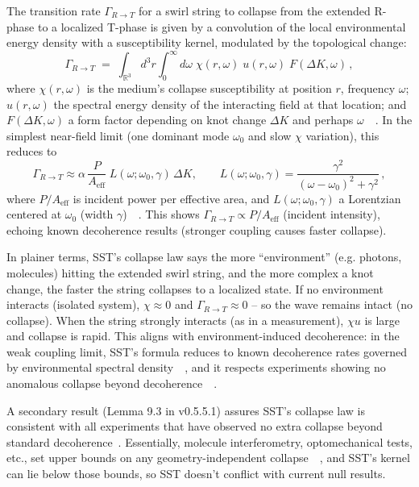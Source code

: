 \documentclass[aps,onecolumn,10pt,nofootinbib]{revtex4}
\begin{document}
	\begin{tcolorbox}[title=Theorem 8.1: R$\to$T Transition Dynamics (Collapse Rate)]
		The transition rate $\Gamma_{R\to T}$ for a swirl string to collapse from the extended R-phase to a localized T-phase is given by a convolution of the local environmental energy density with a susceptibility kernel, modulated by the topological change:
		\[
			\Gamma_{R\to T} \;=\; \int_{\mathbb{R}^3}\! d^3r \int_0^{\infty}\! d\omega\;\chi(r,\omega)\;u(r,\omega)\;F(\Delta K,\omega)\,,
		\]
		where $\chi(r,\omega)$ is the medium’s collapse susceptibility at position $r$, frequency $\omega$; $u(r,\omega)$ the spectral energy density of the interacting field at that location; and $F(\Delta K,\omega)$ a form factor depending on knot change $\Delta K$ and perhaps $\omega$~\cite{index100}~\cite{index101}. In the simplest near-field limit (one dominant mode $\omega_0$ and slow $\chi$ variation), this reduces to
		\[
			\Gamma_{R\to T} \approx \alpha\, \frac{P}{A_{\text{eff}}}\; L(\omega; \omega_0,\gamma)\,\Delta K, \qquad
			L(\omega; \omega_0,\gamma) = \frac{\gamma^2}{(\omega-\omega_0)^2+\gamma^2}\,,
		\]
		where $P/A_{\text{eff}}$ is incident power per effective area, and $L(\omega; \omega_0,\gamma)$ a Lorentzian centered at $\omega_0$ (width $\gamma$)~\cite{index102}~\cite{index103}. This shows $\Gamma_{R\to T} \propto P/A_{\text{eff}}$ (incident intensity), echoing known decoherence results (stronger coupling causes faster collapse).
	\end{tcolorbox}

	\noindent In plainer terms, SST’s collapse law says the more “environment” (e.g. photons, molecules) hitting the extended swirl string, and the more complex a knot change, the faster the string collapses to a localized state. If no environment interacts (isolated system), $\chi \approx 0$ and $\Gamma_{R\to T}\approx 0$ – so the wave remains intact (no collapse). When the string strongly interacts (as in a measurement), $\chi u$ is large and collapse is rapid. This aligns with environment-induced decoherence: in the weak coupling limit, SST’s formula reduces to known decoherence rates governed by environmental spectral density~\cite{index104}~\cite{index105}, and it respects experiments showing no anomalous collapse beyond decoherence~\cite{index106}~\cite{index107}.

	A secondary result (Lemma 9.3 in v0.5.5.1) assures SST’s collapse law is consistent with all experiments that have observed no extra collapse beyond standard decoherence~\cite{index108}. Essentially, molecule interferometry, optomechanical tests, etc., set upper bounds on any geometry-independent collapse~\cite{index109}~\cite{index110}, and SST’s kernel can lie below those bounds, so SST doesn’t conflict with current null results.
\end{document}
